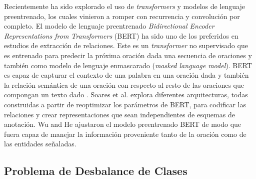 

Recientemente ha sido explorado el uso de \textit{transformers} \cite{vaswani2017attention} y modelos de lenguaje preentrenado, los cuales vinieron a romper con recurrencia y convolución por completo. El modelo de lenguaje preentrenado \textit{Bidirectional Encoder Representations from Transformers} (BERT) ha sido uno de los preferidos en estudios de extracción de relaciones. Este es un \textit{transformer} no supervisado que es entrenado para predecir la próxima oración dada una secuencia de oraciones y también como modelo de lenguaje enmascarado (\textit{masked language model}). BERT es capaz de capturar el contexto de una palabra en una oración dada y también la relación semántica de una oración con respecto al resto de las oraciones que compongan un texto dado \cite{mehmet2020neural}. Soares et al. \cite{soares2019matching} explora diferentes arquitecturas, todas construidas a partir de reoptimizar los parámetros de BERT, para codificar las relaciones y crear representaciones que sean independientes de esquemas de anotación. Wu and He \cite{wu2019enriching} ajustaron el modelo preentrenado BERT de modo que fuera capaz de manejar la información proveniente tanto de la oración como de las entidades señaladas.

\subsection{Problema de Desbalance de Clases}

%

